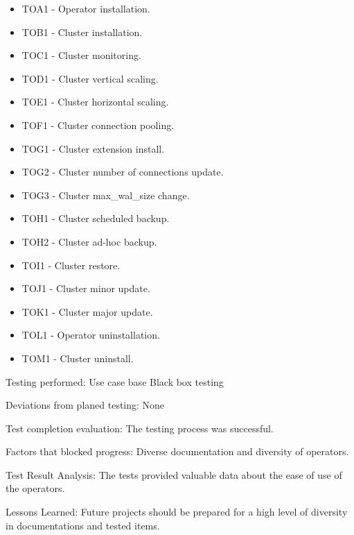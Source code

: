 \begin{itemize}
    \item TOA1 - Operator installation.
    \item TOB1 - Cluster installation.
    \item TOC1 - Cluster monitoring.
    \item TOD1 - Cluster vertical scaling.
    \item TOE1 - Cluster horizontal scaling.
    \item TOF1 - Cluster connection pooling.
    \item TOG1 - Cluster extension install.
    \item TOG2 - Cluster number of connections update.
    \item TOG3 - Cluster max\_wal\_size change.
    \item TOH1 - Cluster scheduled backup.
    \item TOH2 - Cluster ad-hoc backup.
    \item TOI1 - Cluster restore.
    \item TOJ1 - Cluster minor update.
    \item TOK1 - Cluster major update.
    \item TOL1 - Operator uninstallation.
    \item TOM1 - Cluster uninstall.
\end{itemize}

Testing performed: Use case base Black box testing

Deviations from planed testing: None

Test completion evaluation: The testing process was successful.

Factors that blocked progress: Diverse documentation and diversity of operators.

Test Result Analysis: The tests provided valuable data about the ease of use of the operators.

Lessons Learned: Future projects should be prepared for a high level of diversity in documentations and tested items.



